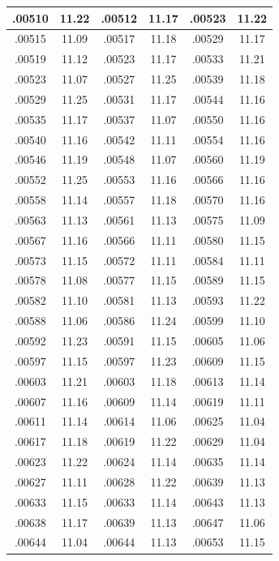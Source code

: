 \documentclass[11pt]{report}
\begin{document}
\begin{appendices}
\begin{longtable}{|c|c||c|c||c|c|}
.00510 & 11.22 & .00512 & 11.17 & .00523 & 11.22\\\hline
.00515 & 11.09 & .00517 & 11.18 & .00529 & 11.17\\\hline
.00519 & 11.12 & .00523 & 11.17 & .00533 & 11.21\\\hline
.00523 & 11.07 & .00527 & 11.25 & .00539 & 11.18\\\hline
.00529 & 11.25 & .00531 & 11.17 & .00544 & 11.16\\\hline
.00535 & 11.17 & .00537 & 11.07 & .00550 & 11.16\\\hline
.00540 & 11.16 & .00542 & 11.11 & .00554 & 11.16\\\hline
.00546 & 11.19 & .00548 & 11.07 & .00560 & 11.19\\\hline
.00552 & 11.25 & .00553 & 11.16 & .00566 & 11.16\\\hline
.00558 & 11.14 & .00557 & 11.18 & .00570 & 11.16\\\hline
.00563 & 11.13 & .00561 & 11.13 & .00575 & 11.09\\\hline
.00567 & 11.16 & .00566 & 11.11 & .00580 & 11.15\\\hline
.00573 & 11.15 & .00572 & 11.11 & .00584 & 11.11\\\hline
.00578 & 11.08 & .00577 & 11.15 & .00589 & 11.15\\\hline
.00582 & 11.10 & .00581 & 11.13 & .00593 & 11.22\\\hline
.00588 & 11.06 & .00586 & 11.24 & .00599 & 11.10\\\hline
.00592 & 11.23 & .00591 & 11.15 & .00605 & 11.06\\\hline
.00597 & 11.15 & .00597 & 11.23 & .00609 & 11.15\\\hline
.00603 & 11.21 & .00603 & 11.18 & .00613 & 11.14\\\hline
.00607 & 11.16 & .00609 & 11.14 & .00619 & 11.11\\\hline
.00611 & 11.14 & .00614 & 11.06 & .00625 & 11.04\\\hline
.00617 & 11.18 & .00619 & 11.22 & .00629 & 11.04\\\hline
.00623 & 11.22 & .00624 & 11.14 & .00635 & 11.14\\\hline
.00627 & 11.11 & .00628 & 11.22 & .00639 & 11.13\\\hline
.00633 & 11.15 & .00633 & 11.14 & .00643 & 11.13\\\hline
.00638 & 11.17 & .00639 & 11.13 & .00647 & 11.06\\\hline
.00644 & 11.04 & .00644 & 11.13 & .00653 & 11.15\\\hline

\end{longtable}
\end{appendices}
\end{document}
